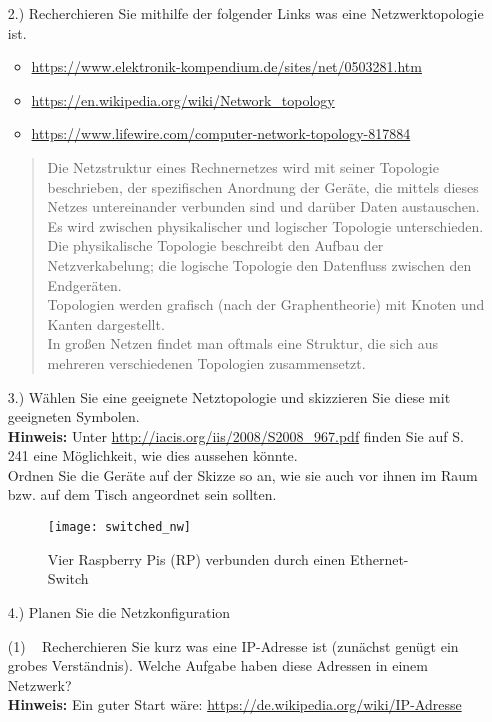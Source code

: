 \documentclass[paper=a4,fontsize=11pt]{scrartcl}%
\numberwithin{equation}{section}
\begin{document}
\begin{itemize}
	\item[2.)] Recherchieren Sie mithilfe der folgender Links was eine Netzwerktopologie ist.
	\begin{itemize}
		\item \url{https://www.elektronik-kompendium.de/sites/net/0503281.htm}
		\item \url{https://en.wikipedia.org/wiki/Network_topology}
		\item \url{https://www.lifewire.com/computer-network-topology-817884}
	\end{itemize}
	\begin{quote}
	Die Netzstruktur eines Rechnernetzes wird mit seiner Topologie beschrieben, der spezifischen Anordnung der Geräte, die mittels dieses Netzes untereinander verbunden sind und darüber Daten austauschen.\\
	Es wird zwischen physikalischer und logischer Topologie unterschieden. Die physikalische Topologie beschreibt den Aufbau der Netzverkabelung; die logische Topologie den Datenfluss zwischen den Endgeräten.\\
Topologien werden grafisch (nach der Graphentheorie) mit Knoten und Kanten dargestellt.\\
In großen Netzen findet man oftmals eine Struktur, die sich aus mehreren verschiedenen Topologien zusammensetzt.
	\end{quote} \cite{wikipedia_topologie}
	\item[3.)] Wählen Sie eine geeignete Netztopologie und skizzieren Sie diese mit geeigneten Symbolen.\\ \textbf{Hinweis:} Unter \url{http://iacis.org/iis/2008/S2008_967.pdf} finden Sie auf S. 241 eine Möglichkeit, wie dies aussehen könnte.\\
	Ordnen Sie die Geräte auf der Skizze so an, wie sie auch vor ihnen im Raum bzw. auf dem Tisch angeordnet sein sollten.
	\begin{figure}[H]
		\centering
		\texttt{[image: switched\_nw]}
		\caption{Vier Raspberry Pis (RP) verbunden durch einen Ethernet-Switch}
	\end{figure}
	\item[4.)] Planen Sie die Netzkonfiguration
\begin{tasks}(1)	
	\task~ Recherchieren Sie kurz was eine IP-Adresse ist (zunächst genügt ein grobes Verständnis). Welche Aufgabe haben diese Adressen in einem Netzwerk?\\
	\textbf{Hinweis:} Ein guter Start wäre: \url{https://de.wikipedia.org/wiki/IP-Adresse}
	\begin{itemize}

\end{itemize}
\end{tasks}
\end{itemize}
\end{document}
